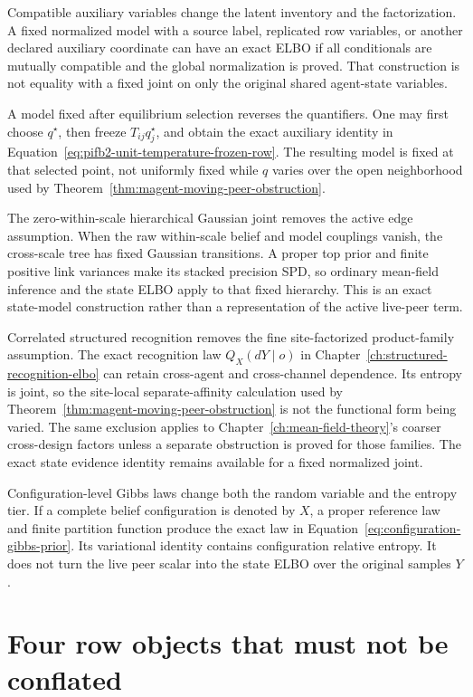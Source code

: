 Compatible auxiliary variables change the latent inventory and the factorization. A fixed normalized model with a source label, replicated row variables, or another declared auxiliary coordinate can have an exact ELBO if all conditionals are mutually compatible and the global normalization is proved. That construction is not equality with a fixed joint on only the original shared agent-state variables.

A model fixed after equilibrium selection reverses the quantifiers. One may first choose \(q^\star\), then freeze \(T_{ij}q_j^\star\), and obtain the exact auxiliary identity in Equation~\eqref{eq:pifb2-unit-temperature-frozen-row}. The resulting model is fixed at that selected point, not uniformly fixed while \(q\) varies over the open neighborhood used by Theorem~\ref{thm:magent-moving-peer-obstruction}.

The zero-within-scale hierarchical Gaussian joint removes the active edge assumption. When the raw within-scale belief and model couplings vanish, the cross-scale tree has fixed Gaussian transitions. A proper top prior and finite positive link variances make its stacked precision SPD, so ordinary mean-field inference and the state ELBO apply to that fixed hierarchy. This is an exact state-model construction rather than a representation of the active live-peer term.

Correlated structured recognition removes the fine site-factorized product-family assumption. The exact recognition law \(Q_X(dY\mid o)\) in Chapter~\ref{ch:structured-recognition-elbo} can retain cross-agent and cross-channel dependence. Its entropy is joint, so the site-local separate-affinity calculation used by Theorem~\ref{thm:magent-moving-peer-obstruction} is not the functional form being varied. The same exclusion applies to Chapter~\ref{ch:mean-field-theory}'s coarser cross-design factors unless a separate obstruction is proved for those families. The exact state evidence identity remains available for a fixed normalized joint.

Configuration-level Gibbs laws change both the random variable and the entropy tier. If a complete belief configuration is denoted by \(X\), a proper reference law and finite partition function produce the exact law in Equation~\eqref{eq:configuration-gibbs-prior}. Its variational identity contains configuration relative entropy. It does not turn the live peer scalar into the state ELBO over the original samples \(Y\).

\section{Four row objects that must not be conflated}


